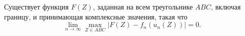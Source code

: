 \begin{theorem} \label{3.3}
Существует функция $F(Z)$, заданная на всем треугольнике $ABC$, включая границу, и
принимающая комплексные значения, такая что $$\displaystyle \lim_{n\to\infty}\max_{Z\in{}ABC}{{|F(Z) - f_n(u_n(Z))|}} = 0.$$
\end{theorem}